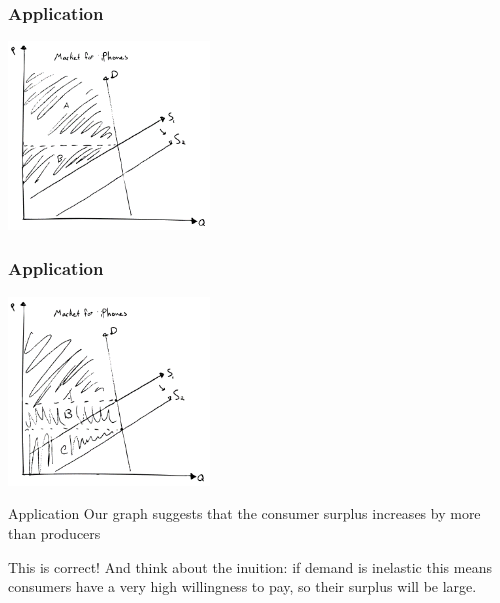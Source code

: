\documentclass[aspectratio=169]{beamer}
\begin{document}
\begin{frame}
    \frametitle{Application}
    \centering
    \includegraphics[width = 0.4\textwidth,keepaspectratio]{../figs/iphone3.png}
\end{frame}

\begin{frame}
    \frametitle{Application}
    \centering
    \includegraphics[width = 0.4\textwidth,keepaspectratio]{../figs/iphone4.png}
\end{frame}

\begin{frame}{Application}
    Our graph suggests that the consumer surplus increases by more than producers

    \vspace{2mm}

    This is correct! And think about the inuition: if demand is inelastic this means consumers have a very high willingness to pay, so their surplus will be large.
\end{frame}
\end{document}
